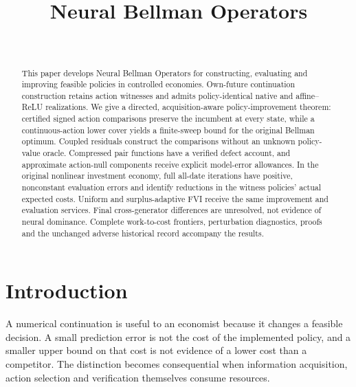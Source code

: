 \documentclass[ecta,nameyear,draft]{econsocart}
\begin{document}
\begin{frontmatter}
\title{Neural Bellman Operators}
\begin{aug}
\author[id=au1,addressref={add1}]{~}
\address[id=add1]{Peking University}
\end{aug}
\begin{abstract}
This paper develops Neural Bellman Operators for constructing, evaluating and improving feasible policies in controlled economies. Own-future continuation construction retains action witnesses and admits policy-identical native and affine--ReLU realizations. We give a directed, acquisition-aware policy-improvement theorem: certified signed action comparisons preserve the incumbent at every state, while a continuous-action lower cover yields a finite-sweep bound for the original Bellman optimum. Coupled residuals construct the comparisons without an unknown policy-value oracle. Compressed pair functions have a verified defect account, and approximate action-null components receive explicit model-error allowances. In the original nonlinear investment economy, full all-date iterations have positive, nonconstant evaluation errors and identify reductions in the witness policies' actual expected costs. Uniform and surplus-adaptive FVI receive the same improvement and evaluation services. Final cross-generator differences are unresolved, not evidence of neural dominance. Complete work-to-cost frontiers, perturbation diagnostics, proofs and the unchanged adverse historical record accompany the results.
\end{abstract}
\begin{keyword}
\end{keyword}
\end{frontmatter}
\section{Introduction}\label{sec:introduction53}
A numerical continuation is useful to an economist because it changes a feasible decision. A small prediction error is not the cost of the implemented policy, and a smaller upper bound on that cost is not evidence of a lower cost than a competitor. The distinction becomes consequential when information acquisition, action selection and verification themselves consume resources.
\end{document}
